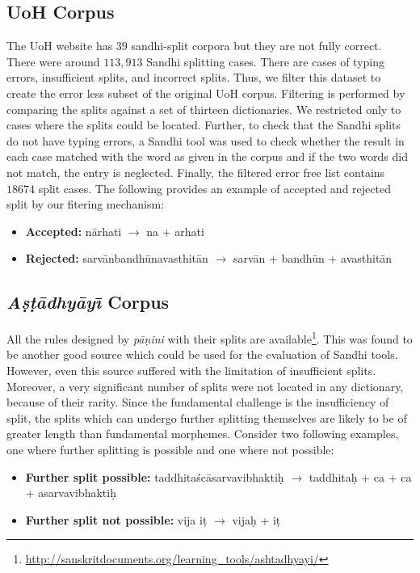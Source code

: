 \documentclass[11pt]{article}
\begin{document}
\subsection{UoH Corpus}
The UoH website has $39$ sandhi-split corpora but they are not fully correct. There were around $113,913$ Sandhi splitting cases. There are cases of typing errors, insufficient splits, and incorrect splits. Thus, we filter this dataset to create the error less subset of the original UoH corpus. Filtering is performed by comparing the splits against a set of thirteen dictionaries. We restricted only to cases where the splits could be located. Further, to check that the Sandhi splits do not have typing errors, a Sandhi tool was used to check whether the result in each case matched with the word as given in the corpus and if the two words did not match, the entry is neglected. Finally, the filtered error free list contains $18674$ split cases. 
The following provides an example of accepted and rejected split by our fitering mechanism: 
\begin{itemize}
	\item \textbf{Accepted:} n\={a}rhati $\rightarrow$ na + arhati
	\item \textbf{Rejected:} sarv\={a}nbandh\={u}navasthit\={a}n $\rightarrow$ sarv\={a}n + bandh\={u}n + avasthit\={a}n 
\end{itemize}

\subsection{\textit{A\d{s}\d{t}\={a}dhy\={a}y\={\i}} Corpus}
All the rules designed by \textit{p\={a}\d{n}ini} with their splits are available\footnote{\url{http://sanskritdocuments.org/learning_tools/ashtadhyayi/}}. This was found to be another good source which could be used for the evaluation of Sandhi tools.  However, even this source suffered with the limitation of insufficient splits. Moreover, a very significant number of splits were not located in any dictionary, because of their rarity.
Since the fundamental challenge is the insufficiency of split, the splits which can undergo further splitting themselves are likely to be of greater length than fundamental morphemes. Consider two following examples, one where further splitting is possible and one where not possible:

\begin{itemize}
	\item \textbf{Further split possible:}  taddhita\'{s}c\={a}sarvavibhakti\d{h} $\rightarrow$ taddhita\d{h} + ca + ca + asarvavibhakti\d{h}
	\item \textbf{Further split not possible:} vija i\d{t} $\rightarrow$ vija\d{h} + i\d{t}  
\end{itemize}
\end{document}
